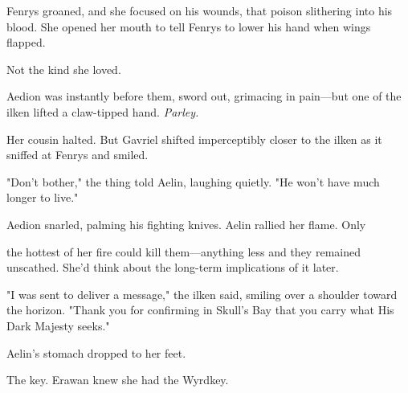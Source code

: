 Fenrys groaned, and she focused on his wounds, that poison slithering into his blood. She opened her mouth to tell Fenrys to lower his hand when wings flapped.

Not the kind she loved.

Aedion was instantly before them, sword out, grimacing in pain---but one of the ilken lifted a claw-tipped hand. \emph{Parley.}

Her cousin halted. But Gavriel shifted imperceptibly closer to the ilken as it sniffed at Fenrys and smiled.

"Don't bother," the thing told Aelin, laughing quietly. "He won't have much longer to live."

Aedion snarled, palming his fighting knives. Aelin rallied her flame. Only

the hottest of her fire could kill them---anything less and they remained unscathed. She'd think about the long-term implications of it later.

"I was sent to deliver a message," the ilken said, smiling over a shoulder toward the horizon. "Thank you for confirming in Skull's Bay that you carry what His Dark Majesty seeks."

Aelin's stomach dropped to her feet.

The key. Erawan knew she had the Wyrdkey.
